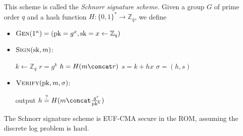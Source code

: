 This scheme is called the \emph{Schnorr signature scheme}. Given a group $G$ of prime order $q$ and a hash function $H : \{0, 1\}^* \to \mathbb{Z}_q$, we define
\begin{itemize}
    \item $\textsc{Gen}(1^n) = (\mathrm{pk} = g^x, \mathrm{sk} = x \gets \mathbb{Z}_q)$
    \item $\textsc{Sign}(\mathrm{sk}, m)$:
        \begin{algorithmic}
            \State $k \gets \mathbb{Z}_q$
            \State $r = g^k$
            \State $h = H(m \concat r)$
            \State $s = k + hx$
            \State $\sigma = (h, s)$
        \end{algorithmic}

    \item $\textsc{Verify}(\mathrm{pk}, m, \sigma)$:
        \begin{algorithmic}
            \State output $h \overset{?}{=} H(m \concat \frac{g^s}{\mathrm{pk}^h})$
        \end{algorithmic}
\end{itemize}

\begin{theorem}
    The Schnorr signature scheme is EUF-CMA secure in the ROM, assuming the discrete log problem is hard.
\end{theorem}

